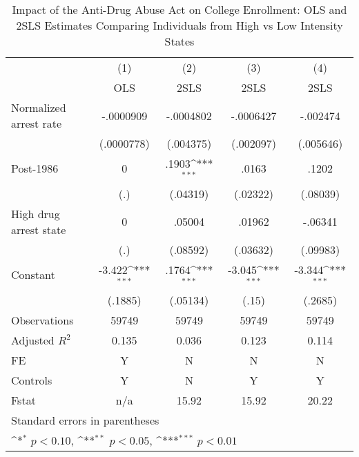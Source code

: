 \begin{table}[htbp]\centering
\def\sym#1{\ifmmode^{#1}\else\(^{#1}\)\fi}
\caption{Impact of the Anti-Drug Abuse Act on College Enrollment: OLS and 2SLS Estimates Comparing Individuals from High vs Low Intensity States}
\begin{tabular}{l*{4}{c}}
\hline\hline
                    &\multicolumn{1}{c}{(1)}&\multicolumn{1}{c}{(2)}&\multicolumn{1}{c}{(3)}&\multicolumn{1}{c}{(4)}\\
                    &\multicolumn{1}{c}{OLS}&\multicolumn{1}{c}{2SLS}&\multicolumn{1}{c}{2SLS}&\multicolumn{1}{c}{2SLS}\\
\hline
Normalized arrest rate&   -.0000909         &   -.0004802         &   -.0006427         &    -.002474         \\
                    &  (.0000778)         &   (.004375)         &   (.002097)         &   (.005646)         \\
[1em]
Post-1986           &           0         &       .1903\sym{***}&       .0163         &       .1202         \\
                    &         (.)         &    (.04319)         &    (.02322)         &    (.08039)         \\
[1em]
High drug arrest state&           0         &      .05004         &      .01962         &     -.06341         \\
                    &         (.)         &    (.08592)         &    (.03632)         &    (.09983)         \\
[1em]
Constant            &      -3.422\sym{***}&       .1764\sym{***}&      -3.045\sym{***}&      -3.344\sym{***}\\
                    &     (.1885)         &    (.05134)         &       (.15)         &     (.2685)         \\
\hline
Observations        &       59749         &       59749         &       59749         &       59749         \\
Adjusted \(R^{2}\)  &       0.135         &       0.036         &       0.123         &       0.114         \\
FE                  &           Y         &           N         &           N         &           N         \\
Controls            &           Y         &           N         &           Y         &           Y         \\
Fstat               &         n/a         &       15.92         &       15.92         &       20.22         \\
\hline\hline
\multicolumn{5}{l}{\footnotesize Standard errors in parentheses}\\
\multicolumn{5}{l}{\footnotesize \sym{*} \(p<0.10\), \sym{**} \(p<0.05\), \sym{***} \(p<0.01\)}\\
\end{tabular}
\end{table}
